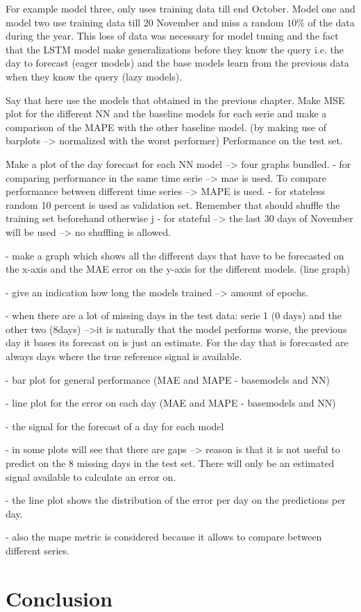 For example model three, only uses training data till end October. Model one and model two use training data till $ 20 $ November and miss a random $ 10 \%$ of the data during the year. This loss of data was necessary for model tuning and the fact that the LSTM model make generalizations before they know the query i.e. the day to forecast (eager models) and the base models learn from the previous data when they know the query (lazy models).

Say that here use the models that obtained in the previous chapter. Make MSE plot for the different NN and the baseline models for each serie and make a comparison of the MAPE with the other baseline model. (by making use of barplots --> normalized with the worst performer) Performance on the test set. 

Make a plot of the day forecast for each NN model --> four graphs bundled. 
- for comparing performance in the same time serie --> mae is used. To compare performance between different time series --> MAPE is used. 
- for stateless random 10 percent is used as validation set. Remember that should shuffle the training set beforehand otherwise j
- for stateful --> the last 30 days of November will be used --> no shuffling is allowed.

- make a graph which shows all the different days that have to be forecasted on the x-axis and the MAE error on the y-axis for the different models. (line graph)

- give an indication how long the models trained --> amount of epochs. 

- when there are a lot of missing days in the test data: serie 1 (0 days) and the other two (8days) -->it is naturally that the model performs worse, the previous day it bases its forecast on is just an estimate. For the day that is forecasted are always days where the true reference signal is available. 



- bar plot for general performance (MAE and MAPE - basemodels and NN)

- line plot for the error on each day (MAE and MAPE - basemodels and NN)

- the signal for the forecast of a day for each model

- in some plots will see that there are gaps --> reason is that it is not useful to predict on the $ 8 $ missing days in the test set. There will only be an estimated signal available to calculate an error on. 

- the line plot shows the distribution of the error per day on the predictions per day. 

- also the mape metric is considered because it allows to compare between different series. 


\section{Conclusion}


